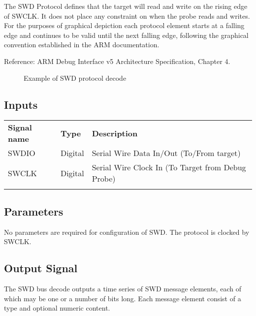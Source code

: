 The SWD Protocol defines that the target will read and write on the rising edge of SWCLK. It does not place any constraint
on when the probe reads and writes. For the purposes of graphical depiction each protocol element starts at a falling edge
and continues to be valid until the next falling edge, following the graphical convention established in the ARM documentation.

Reference: ARM Debug Interface v5 Architecture Specification, Chapter 4.

\begin{figure}[h]
\centering
{}
\caption{Example of SWD protocol decode}
\label{swd_example}
\end{figure}

\subsection{Inputs}

\begin{tabularx}{16cm}{llX}
\thickhline
\textbf{Signal name} & \textbf{Type} & \textbf{Description} \\
\thickhline
SWDIO & Digital & Serial Wire Data In/Out (To/From target)\\
SWCLK & Digital & Serial Wire Clock In (To Target from Debug Probe)\\
\thickhline
\end{tabularx}

\subsection{Parameters}

No parameters are required for configuration of SWD. The protocol is clocked by SWCLK.

\subsection{Output Signal}

The SWD bus decode outputs a time series of SWD message elements, each of which may be one or a number of bits long.
Each message element consist of a type and optional numeric content.

